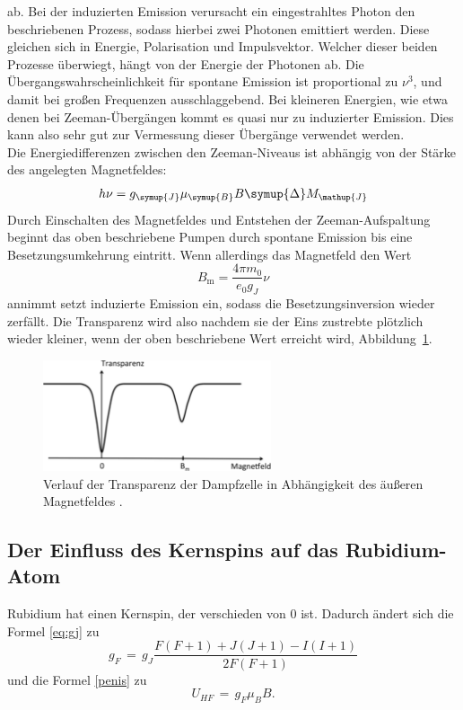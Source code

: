 \documentclass[
  bibliography=totoc,     %
  captions=tableheading,  %
  titlepage=firstiscover, %
]{scrartcl}
\begin{document}
ab. Bei der induzierten Emission verursacht ein eingestrahltes Photon
den beschriebenen Prozess, sodass hierbei zwei Photonen emittiert werden. Diese
gleichen sich in Energie, Polarisation und Impulsvektor. Welcher dieser beiden
Prozesse überwiegt, hängt von der Energie der Photonen ab. Die
Übergangswahrscheinlichkeit für spontane Emission ist proportional zu $\nu^3$,
und damit bei großen Frequenzen ausschlaggebend. Bei kleineren Energien, wie
etwa denen bei Zeeman-Übergängen kommt es quasi nur zu induzierter Emission.
Dies kann also sehr gut zur Vermessung dieser Übergänge verwendet werden. \\
Die Energiedifferenzen zwischen den Zeeman-Niveaus ist abhängig von der Stärke
des angelegten Magnetfeldes:
%
\begin{equation}
  h\nu=g_{\symup{J}}\mu_{\symup{B}}B\symup{\Delta}M_{\mathup{J}}
  \label{eq:übergangsenergie}
\end{equation}
%
Durch Einschalten des Magnetfeldes und Entstehen der Zeeman-Aufspaltung beginnt
das oben beschriebene Pumpen durch spontane Emission bis eine
Besetzungsumkehrung eintritt. Wenn allerdings das Magnetfeld den Wert
%
\begin{equation}
  B_{\mathup{m}}=\frac{4\pi m_0}{e_0g_J}\nu
\end{equation}
%
annimmt setzt induzierte Emission ein, sodass die Besetzungsinversion wieder
zerfällt. Die Transparenz wird also nachdem sie der Eins zustrebte plötzlich
wieder kleiner, wenn der oben beschriebene Wert erreicht wird, Abbildung~\ref{fig:transparenz_b}.
%
\begin{figure}[htb]
  \centering
  \includegraphics[width=0.6\textwidth]{transparenzkurve.pdf}
  \caption{Verlauf der Transparenz der Dampfzelle in Abhängigkeit des äußeren Magnetfeldes \cite{anleitung}.}
  \label{fig:transparenz_b}
\end{figure}
%
\subsection{Der Einfluss des Kernspins auf das Rubidium-Atom}
Rubidium hat einen Kernspin, der verschieden von 0 ist. Dadurch ändert sich die
Formel \eqref{eq:gj} zu
\begin{equation}
  g_{F}\,=\,g_{J} \frac{F(F+1)+J(J+1)-I(I+1)}{2F(F+1)}
\end{equation}
und die Formel \eqref{penis} zu
\begin{equation}
  U_{HF}\,=\,g_{F}\mu_{B} B.
\end{equation}
\end{document}
